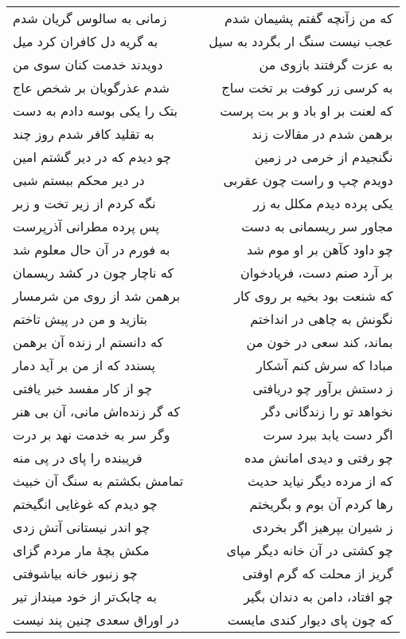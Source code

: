 \begin{center}
\begin{longtable}{l p{0.5cm} r}
زمانی به سالوس گریان شدم
&&
که من زآنچه گفتم پشیمان شدم
\\
به گریه دل کافران کرد میل
&&
عجب نیست سنگ ار بگردد به سیل
\\
دویدند خدمت کنان سوی من
&&
به عزت گرفتند بازوی من
\\
شدم عذرگویان بر شخص عاج
&&
به کرسی زر کوفت بر تخت ساج
\\
بتک را یکی بوسه دادم به دست
&&
که لعنت بر او باد و بر بت پرست
\\
به تقلید کافر شدم روز چند
&&
برهمن شدم در مقالات زند
\\
چو دیدم که در دیر گشتم امین
&&
نگنجیدم از خرمی در زمین
\\
در دیر محکم ببستم شبی
&&
دویدم چپ و راست چون عقربی
\\
نگه کردم از زیر تخت و زبر
&&
یکی پرده دیدم مکلل به زر
\\
پس پرده مطرانی آذرپرست
&&
مجاور سر ریسمانی به دست
\\
به فورم در آن حال معلوم شد
&&
چو داود کآهن بر او موم شد
\\
که ناچار چون در کشد ریسمان
&&
بر آرد صنم دست، فریادخوان
\\
برهمن شد از روی من شرمسار
&&
که شنعت بود بخیه بر روی کار
\\
بتازید و من در پیش تاختم
&&
نگونش به چاهی در انداختم
\\
که دانستم ار زنده آن برهمن
&&
بماند، کند سعی در خون من
\\
پسندد که از من بر آید دمار
&&
مبادا که سرش کنم آشکار
\\
چو از کار مفسد خبر یافتی
&&
ز دستش برآور چو دریافتی
\\
که گر زنده‌اش مانی، آن بی هنر
&&
نخواهد تو را زندگانی دگر
\\
وگر سر به خدمت نهد بر درت
&&
اگر دست یابد ببرد سرت
\\
فریبنده را پای در پی منه
&&
چو رفتی و دیدی امانش مده
\\
تمامش بکشتم به سنگ آن خبیث
&&
که از مرده دیگر نیاید حدیث
\\
چو دیدم که غوغایی انگیختم
&&
رها کردم آن بوم و بگریختم
\\
چو اندر نیستانی آتش زدی
&&
ز شیران بپرهیز اگر بخردی
\\
مکش بچهٔ مار مردم گزای
&&
چو کشتی در آن خانه دیگر مپای
\\
چو زنبور خانه بیاشوفتی
&&
گریز از محلت که گرم اوفتی
\\
به چابک‌تر از خود مینداز تیر
&&
چو افتاد، دامن به دندان بگیر
\\
در اوراق سعدی چنین پند نیست
&&
که چون پای دیوار کندی مایست
\\

\end{longtable}
\end{center}
